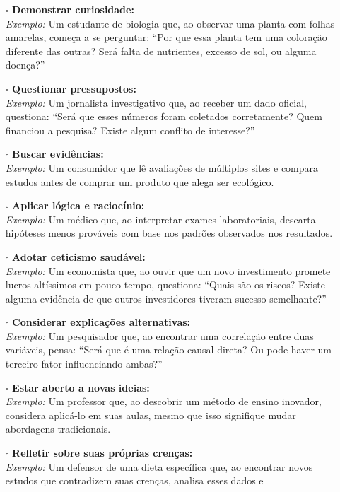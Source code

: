 \documentclass[
  letterpaper,
  DIV=11,
  numbers=noendperiod]{scrreprt}
\begin{document}
\begin{itemize}
\item[$\square$]
  \textbf{Demonstrar curiosidade:}\\
  \emph{Exemplo:} Um estudante de biologia que, ao observar uma planta
  com folhas amarelas, começa a se perguntar: ``Por que essa planta tem
  uma coloração diferente das outras? Será falta de nutrientes, excesso
  de sol, ou alguma doença?''
\item[$\square$]
  \textbf{Questionar pressupostos:}\\
  \emph{Exemplo:} Um jornalista investigativo que, ao receber um dado
  oficial, questiona: ``Será que esses números foram coletados
  corretamente? Quem financiou a pesquisa? Existe algum conflito de
  interesse?''
\item[$\square$]
  \textbf{Buscar evidências:}\\
  \emph{Exemplo:} Um consumidor que lê avaliações de múltiplos sites e
  compara estudos antes de comprar um produto que alega ser ecológico.
\item[$\square$]
  \textbf{Aplicar lógica e raciocínio:}\\
  \emph{Exemplo:} Um médico que, ao interpretar exames laboratoriais,
  descarta hipóteses menos prováveis com base nos padrões observados nos
  resultados.
\item[$\square$]
  \textbf{Adotar ceticismo saudável:}\\
  \emph{Exemplo:} Um economista que, ao ouvir que um novo investimento
  promete lucros altíssimos em pouco tempo, questiona: ``Quais são os
  riscos? Existe alguma evidência de que outros investidores tiveram
  sucesso semelhante?''
\item[$\square$]
  \textbf{Considerar explicações alternativas:}\\
  \emph{Exemplo:} Um pesquisador que, ao encontrar uma correlação entre
  duas variáveis, pensa: ``Será que é uma relação causal direta? Ou pode
  haver um terceiro fator influenciando ambas?''
\item[$\square$]
  \textbf{Estar aberto a novas ideias:}\\
  \emph{Exemplo:} Um professor que, ao descobrir um método de ensino
  inovador, considera aplicá-lo em suas aulas, mesmo que isso signifique
  mudar abordagens tradicionais.
\item[$\square$]
  \textbf{Refletir sobre suas próprias crenças:}\\
  \emph{Exemplo:} Um defensor de uma dieta específica que, ao encontrar
  novos estudos que contradizem suas crenças, analisa esses dados e

\end{itemize}
\end{document}
